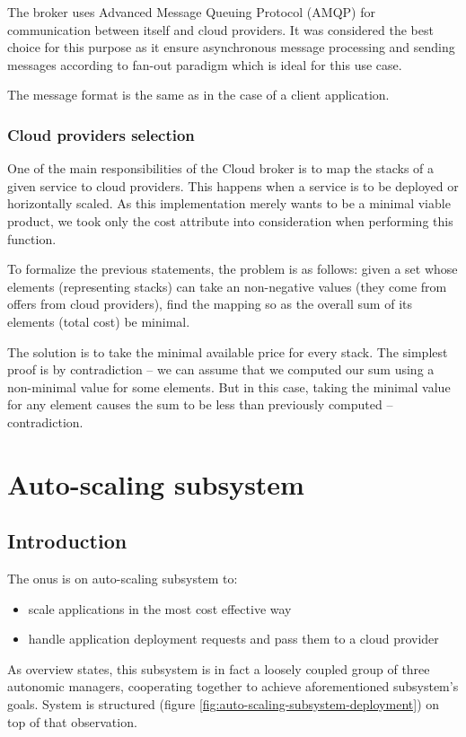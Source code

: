 The broker uses Advanced Message Queuing Protocol (AMQP) for communication between itself and cloud providers. It was considered the best choice for this purpose as it ensure asynchronous message processing and sending messages according to fan-out paradigm which is ideal for this use case.

The message format is the same as in the case of a client application.

\subsubsection{Cloud providers selection}
One of the main responsibilities of the Cloud broker is to map the stacks of a given service to cloud providers. This happens when a service is to be deployed or horizontally scaled. As this implementation merely wants to be a minimal viable product, we took only the cost attribute into consideration when performing this function.

To formalize the previous statements, the problem is as follows: given a set whose elements (representing stacks) can take an non-negative values (they come from offers from cloud providers), find the mapping so as the overall sum of its elements (total cost) be minimal.

The solution is to take the minimal available price for every stack. The simplest proof is by contradiction -- we can assume that we computed our sum using a non-minimal value for some elements. But in this case, taking the minimal value for any element causes the sum to be less than previously computed -- contradiction.

\section{Auto-scaling subsystem}

\subsection{Introduction}
The onus is on auto-scaling subsystem to:
\begin{itemize}
 \item scale applications in the most cost effective way
 \item handle application deployment requests and pass them to a cloud provider 
\end{itemize}

As overview states, this subsystem is in fact a loosely coupled group of three autonomic managers, cooperating together to achieve aforementioned subsystem's goals. System is structured (figure \ref{fig:auto-scaling-subsystem-deployment}) on top of that observation.

